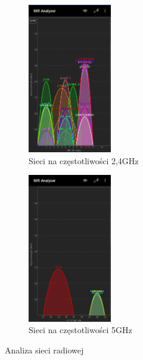 \documentclass{article} %
\begin{document}
\begin{figure}[H]
    \centering
    \begin{subfigure}[b]{0.49\textwidth}
        \centering
        \includegraphics[width=0.4\textwidth]{Sieci-2,4GH}
        \caption{Sieci na częstotliwości 2,4GHz}
    \end{subfigure}
    \begin{subfigure}[b]{0.49\textwidth}
        \centering
        \includegraphics[width=0.4\textwidth]{Sieci-5GH}
        \caption{Sieci na częstotliwości 5GHz}
    \end{subfigure}

    \caption{Analiza sieci radiowej}
    \label{fig:wifiAnalizer}
\end{figure}
\end{document}

